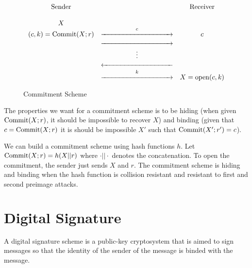 \begin{figure}[!h]
    \setlength\fboxsep{0pt}
    \setlength\fboxrule{0.5pt}
    \centering
        \[
        \begin{array}{ccc}
        \mbox{Sender}      &                   & \mbox{Receiver}           \\
                           &                   &                           \\
          X                &                   &                           \\
     (c,k) = \commit{X;r}  & \prightarrow{c}   &       c                   \\
                           & \prightarrow{}    &                           \\
                           &    \vdots         &                           \\
                           & \pleftarrow{}     &                           \\
                           & \prightarrow{k}   &   X=\mathrm{open}(c,k)    \\

        \end{array}
        \]
    \caption{Commitment Scheme}
    \label{fig:commit}
    
\end{figure}


The properties we want for a commitment scheme is to be hiding (when given $\mathrm{Commit}(X;r)$, it should be impossible to recover $X$) and binding 
(given that $c = \mathrm{Commit}(X;r)$ it is should be impossible  $X'$ such that $\mathrm{Commit}(X';r') = c$).

\begin{example}
    \label{example:commitment}
   We can build a commitment scheme using hash functions $h$. Let $\mathrm{Commit}(X;r) = h(X||r)$ where $ \cdot || \cdot $ denotes the concatenation.
   To open the commitment, the sender just sends $X$ and $r$. The commitment scheme is hiding
   and binding when the hash function is collision resistant and resistant to first and second
   preimage attacks.
\end{example}

\section{Digital Signature}
\label{sec:signature}
A digital signature scheme is a public-key cryptosystem that is aimed to sign messages so that the identity of the sender of the message is binded with the message.

